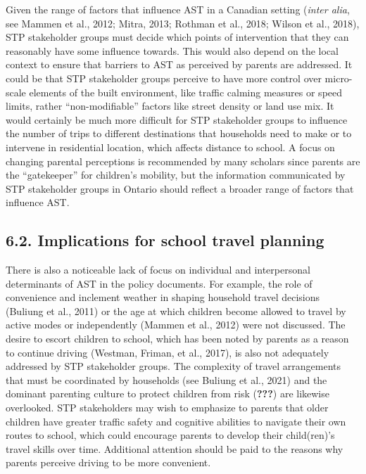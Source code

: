 \documentclass[]{elsarticle} %
\begin{document}
Given the range of factors that influence AST in a Canadian setting
(\emph{inter alia}, see Mammen et al., 2012; Mitra, 2013; Rothman et
al., 2018; Wilson et al., 2018), STP stakeholder groups must decide
which points of intervention that they can reasonably have some
influence towards. This would also depend on the local context to ensure
that barriers to AST as perceived by parents are addressed. It could be
that STP stakeholder groups perceive to have more control over
micro-scale elements of the built environment, like traffic calming
measures or speed limits, rather ``non-modifiable'' factors like street
density or land use mix. It would certainly be much more difficult for
STP stakeholder groups to influence the number of trips to different
destinations that households need to make or to intervene in residential
location, which affects distance to school. A focus on changing parental
perceptions is recommended by many scholars since parents are the
``gatekeeper'' for children's mobility, but the information communicated
by STP stakeholder groups in Ontario should reflect a broader range of
factors that influence AST.

\hypertarget{implications-for-school-travel-planning}{%
\subsection{6.2. Implications for school travel
planning}\label{implications-for-school-travel-planning}}

There is also a noticeable lack of focus on individual and interpersonal
determinants of AST in the policy documents. For example, the role of
convenience and inclement weather in shaping household travel decisions
(Buliung et al., 2011) or the age at which children become allowed to
travel by active modes or independently (Mammen et al., 2012) were not
discussed. The desire to escort children to school, which has been noted
by parents as a reason to continue driving (Westman, Friman, et al.,
2017), is also not adequately addressed by STP stakeholder groups. The
complexity of travel arrangements that must be coordinated by households
(see Buliung et al., 2021) and the dominant parenting culture to protect
children from risk ({\textbf{???}}) are likewise overlooked. STP
stakeholders may wish to emphasize to parents that older children have
greater traffic safety and cognitive abilities to navigate their own
routes to school, which could encourage parents to develop their
child(ren)'s travel skills over time. Additional attention should be
paid to the reasons why parents perceive driving to be more convenient.
\end{document}
